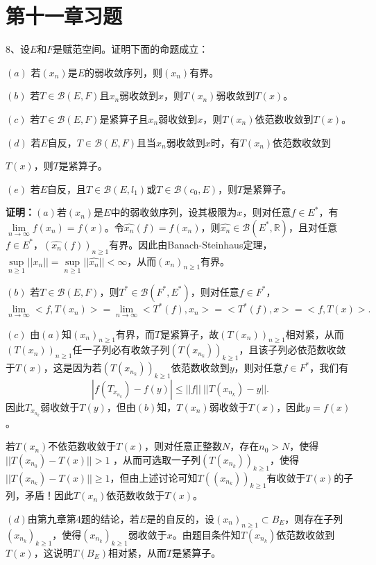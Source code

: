\documentclass[12pt,fancyhdr,UTF8,openany]{ctexart}
\begin{document}
\section*{第十一章习题}
8、设$E$和$F$是赋范空间。证明下面的命题成立：\par 
$(a)$ 若$(x_n)$是$E$的弱收敛序列，则$(x_n)$有界。\par 
$(b)$ 若$T\in\mathcal{B}(E,F)$且$x_n$弱收敛到$x$，则$T(x_n)$弱收敛到$T(x)$。\par 
$(c)$ 若$T\in\mathcal{B}(E,F)$是紧算子且$x_n$弱收敛到$x$，则$T(x_n)$依范数收敛到$T(x)$。\par 
$(d)$ 若$E$自反，$T\in\mathcal{B}(E,F)$且当$x_n$弱收敛到$x$时，有$T(x_n)$依范数收敛到\par $T(x)$，则$T$是紧算子。\par 
$(e)$ 若$E$自反，且$T\in\mathcal{B}(E,l_1)$或$T\in\mathcal{B}(c_0,E)$，则$T$是紧算子。\par 
\textbf{证明：}$(a)$若$(x_n)$是$E$中的弱收敛序列，设其极限为$x$，则对任意$f\in E^*$，有$\lim\limits_{n\rightarrow \infty}f(x_n)=f(x)$。令$\hat{x_n}(f)=f(x_n)$，则$\hat{x_n}\in\mathcal{B}(E^*,\mathbb{R})$，且对任意$f\in E^*$，$(\hat{x_n}(f))_{n\geqslant 1}$有界。因此由Banach-Steinhaus定理，$\sup\limits_{n\geqslant 1}||x_n||=\sup\limits_{n\geqslant 1}||\hat{x_n}||<\infty$，从而$(x_n)_{n\geqslant 1}$有界。\par 
$(b)$ 若$T\in\mathcal{B}(E,F)$，则$T^*\in\mathcal{B}(F^*,E^*)$，则对任意$f\in F^*$，
\[ \lim\limits_{n\rightarrow \infty}<f,T(x_n)>=\lim\limits_{n\rightarrow \infty}<T^*(f),x_n>=<T^*(f),x>=<f,T(x)>.\]\par 
$(c)$ 由$(a)$知$(x_n)_{n\geqslant 1}$有界，而$T$是紧算子，故$(T(x_n))_{n\geqslant 1}$相对紧，从而$(T(x_n))_{n\geqslant 1}$任一子列必有收敛子列$(T(x_{n_k}))_{k\geqslant 1 }$，且该子列必依范数收敛于$T(x)$，这是因为若$(T(x_{n_k}))_{k\geqslant 1}$依范数收敛到$y$，则对任意$f\in F^*$，我们有
\[|f(T_{x_{n_k}})-f(y)|\leqslant ||f||~||T(x_{n_k})-y||.\]
因此$T_{x_{n_k}}$弱收敛于$T(y)$，但由$(b)$知，$T(x_n)$弱收敛于$T(x)$，因此$y=f(x)$。\par 若$T(x_n)$不依范数收敛于$T(x)$，则对任意正整数$N$，存在$n_0>N$，使得$||T(x_{n_0})-T(x)||>1$
，从而可选取一子列$(T(x_{n_k}))_{k\geqslant 1}$，使得$||T(x_{n_k})-T(x)||\geqslant1$，但由上述讨论可知$T((x_{n_k}))_{k\geqslant 1}$有收敛于$T(x)$的子列，矛盾！因此$T(x_n)$依范数收敛于$T(x)$。\par 
$(d)$由第九章第4题的结论，若$E$是的自反的，设$(x_n)_{n\geqslant 1}\subset B_E$，则存在子列$(x_{n_k})_{k\geqslant 1}$，使得$(x_{n_k})_{k\geqslant1}$弱收敛于$x$。由题目条件知$T(x_{n_k})$依范数收敛到$T(x)$，这说明$T(B_E)$相对紧，从而$T$是紧算子。
\end{document}
